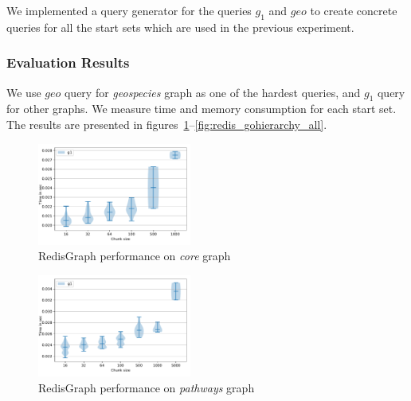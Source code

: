 \begin{algorithm}
\end{algorithm}

We implemented a query generator for the queries $g_1$ and $geo$ to create concrete queries for all the start sets which are used in the previous experiment.


\subsubsection{Evaluation Results}

We use $geo$ query for \textit{geospecies} graph as one of the hardest queries, and $g_1$ query for other graphs.
We measure time and memory consumption for each start set.
The results are presented in figures~\ref{fig:redis_core_all}--\ref{fig:redis_gohierarchy_all}.

\begin{figure}[h]
\centering
\includegraphics[width=0.45\textwidth]{data/raw_redis/core.pdf}
\caption{RedisGraph performance on \textit{core} graph}
\label{fig:redis_core_all}
\end{figure}


\begin{figure}[h]
\centering
\includegraphics[width=0.45\textwidth]{data/raw_redis/pathways.pdf}
\caption{RedisGraph performance on \textit{pathways} graph}
\label{fig:redis_pathways_all}
\end{figure}

